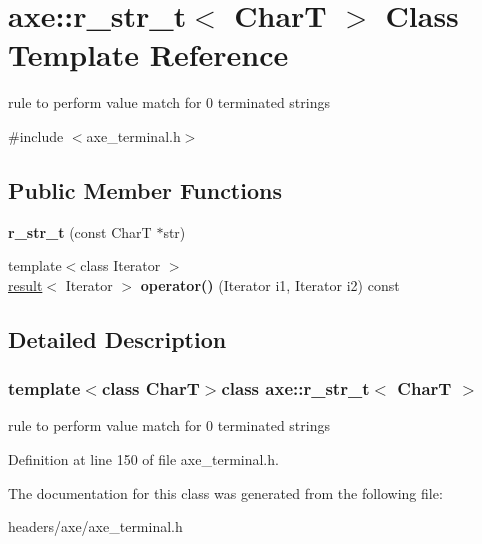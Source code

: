 \hypertarget{classaxe_1_1r__str__t}{\section{axe\+:\+:r\+\_\+str\+\_\+t$<$ Char\+T $>$ Class Template Reference}
\label{classaxe_1_1r__str__t}
}


rule to perform value match for 0 terminated strings  




{\ttfamily \#include $<$axe\+\_\+terminal.\+h$>$}

\subsection*{Public Member Functions}
\begin{DoxyCompactItemize}
\item 
\hypertarget{classaxe_1_1r__str__t_ae51262348420b21a43947300465add22}{{\bfseries r\+\_\+str\+\_\+t} (const Char\+T $\ast$str)}\label{classaxe_1_1r__str__t_ae51262348420b21a43947300465add22}

\item 
\hypertarget{classaxe_1_1r__str__t_a9331d95ee2559169276b5da59a68c066}{{\footnotesize template$<$class Iterator $>$ }\\\hyperlink{structaxe_1_1result}{result}$<$ Iterator $>$ {\bfseries operator()} (Iterator i1, Iterator i2) const }\label{classaxe_1_1r__str__t_a9331d95ee2559169276b5da59a68c066}

\end{DoxyCompactItemize}


\subsection{Detailed Description}
\subsubsection*{template$<$class Char\+T$>$class axe\+::r\+\_\+str\+\_\+t$<$ Char\+T $>$}

rule to perform value match for 0 terminated strings 

Definition at line 150 of file axe\+\_\+terminal.\+h.



The documentation for this class was generated from the following file\+:\begin{DoxyCompactItemize}
\item 
headers/axe/axe\+\_\+terminal.\+h\end{DoxyCompactItemize}
